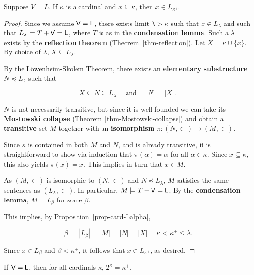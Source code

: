 \begin{lemma}\label{lemma-l-gch}Suppose $V=L$. If $\kappa$ is a cardinal and $x \subseteq \kappa$, then $x \in L_{\kappa^+}$.

\end{lemma}\begin{proof}Since we assume $\mathsf{V=L}$, there exists limit $\lambda > \kappa$ such that $x \in L_\lambda$ and such that $L_\lambda \models T + \mathsf{V=L}$, where $T$ is as in the \textbf{condensation lemma}. Such a $\lambda$ exists by the \textbf{reflection theorem} (Theorem~\ref{thm-reflection}).  Let $X = \kappa \cup \{x\}$. By choice of $\lambda$, $X \subseteq L_\lambda$.

By the \href{https://en.wikipedia.org/wiki/L\%C3\%B6wenheim\%E2\%80\%93Skolem\_theorem}{Löwenheim-Skolem Theorem}, there exists an \textbf{elementary substructure} $N \preceq L_\lambda$ such that

\begin{equation*}
\tag{$*$}
    X \subseteq N \subseteq L_\lambda \quad \text{ and } \quad |N| = |X|.
\end{equation*}

$N$ is not necessarily transitive, but since it is well-founded we can take its \textbf{Mostowski collapse} (Theorem~\ref{thm-Mostowski-collapse}) and obtain a \textbf{transitive} set $M$
together with an \textbf{isomorphism} $\pi: (N,\in) \to (M,\in)$.

Since $\kappa$ is contained in both $M$ and $N$, and is already transitive, it is straightforward to show via induction that $\pi(\alpha) = \alpha$ for all $\alpha \in \kappa$. Since $x \subseteq \kappa$, this also yields $\pi(x) = x$. This implies in turn that $x \in M$.

As $(M,\in)$ is isomorphic to $(N,\in)$ and $N \preceq L_\lambda$, $M$ satisfies the same sentences as $(L_\lambda, \in)$. In particular, $M \models T + \mathsf{V=L}$. By the \textbf{condensation lemma}, $M = L_\beta$ for some $\beta$.

This implies, by Proposition~\ref{prop-card-Lalpha},

\begin{equation}
|\beta| = |L_\beta| = |M| = |N| = |X| = \kappa < \kappa^+ \leq \lambda.
\end{equation}

Since $x \in L_\beta$ and $\beta < \kappa^+$, it follows that $x \in L_{\kappa^+}$, as desired.

\end{proof}\begin{theorem}[Gödel]\label{thm-l-gch}If $\mathsf{V=L}$, then for all cardinals $\kappa$, $2^\kappa = \kappa^+$.


\end{theorem}
